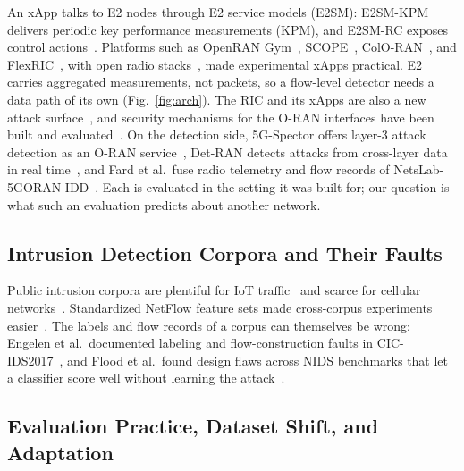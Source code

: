 An xApp talks to E2 nodes through E2 service models (E2SM): E2SM-KPM delivers periodic key performance measurements (KPM), and E2SM-RC exposes control actions~\cite{polese2023understanding}. Platforms such as OpenRAN Gym~\cite{bonati2023openrangym}, SCOPE~\cite{bonati2021scope}, ColO-RAN~\cite{polese2023coloran}, and FlexRIC~\cite{schmidt2021flexric}, with open radio stacks~\cite{nikaein2014oai,gomez2016srslte}, made experimental xApps practical. E2 carries aggregated measurements, not packets, so a flow-level detector needs a data path of its own (Fig.~\ref{fig:arch}). The RIC and its xApps are also a new attack surface~\cite{etsi_wg11_threat,liyanage2023openran,mimran2022security}, and security mechanisms for the O-RAN interfaces have been built and evaluated~\cite{groen2025implementing}. On the detection side, 5G-Spector offers layer-3 attack detection as an O-RAN service~\cite{wen2024spector}, Det-RAN detects attacks from cross-layer data in real time~\cite{scalingi2024detran}, and Fard et al.\ fuse radio telemetry and flow records of NetsLab-5GORAN-IDD~\cite{fard2026crosslayer}. Each is evaluated in the setting it was built for; our question is what such an evaluation predicts about another network.

\subsection{Intrusion Detection Corpora and Their Faults}

Public intrusion corpora are plentiful for IoT traffic~\cite{koroniotis2019botiot,moustafa2021toniot,ferrag2022edgeiiot,neto2023ciciot,sharafaldin2018cicids} and scarce for cellular networks~\cite{samarakoon2022nidd,siriwardhana2025descriptor,abedzadeh2025netslab,nugraha2025fivegdatasets}. Standardized NetFlow feature sets made cross-corpus experiments easier~\cite{sarhan2021netflow,sarhan2022standard}. The labels and flow records of a corpus can themselves be wrong: Engelen et al.\ documented labeling and flow-construction faults in CIC-IDS2017~\cite{engelen2021troubleshooting}, and Flood et al.\ found design flaws across NIDS benchmarks that let a classifier score well without learning the attack~\cite{flood2024smells}.

\subsection{Evaluation Practice, Dataset Shift, and Adaptation}

